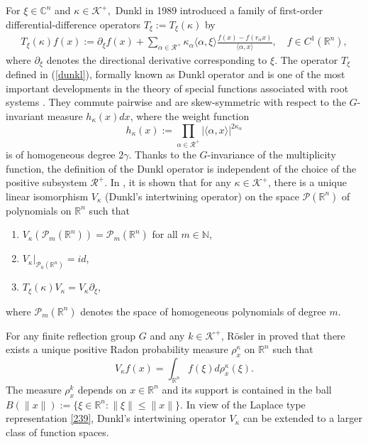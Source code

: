 \documentclass[a4paper,11pt, reqno]{amsart}
\numberwithin{equation}{section}
\theoremstyle{plain}
\theoremstyle{definition}
\theoremstyle{remark}
\begin{document}
 For $\xi \in \mathbb{C}^{n}$ and $\kappa \in \mathcal{K}^{+},$ Dunkl  in 1989 introduced a family of first-order differential-difference operators $T_{\xi}:= T_{\xi}(\kappa)$  by
	\begin{align}\label{dunkl}
		T_{\xi}(\kappa) f(x):=\partial_{\xi} f(x)+\sum_{\alpha \in \mathcal{R}^{+}} \kappa_{\alpha }\langle \alpha, \xi\rangle \frac{f(x)-f\left(r_{\alpha} x\right)}{\langle \alpha, x\rangle}, \quad f \in C^{1}\left(\mathbb{R}^{n}\right),
	\end{align}
	where $\partial_{\xi}$ denotes the directional derivative corresponding to $\xi$.  The operator $T_\xi$   defined in (\ref{dunkl}), formally known as Dunkl operator and is one of the most important developments in the theory of special functions associated with root systems \cite{dun}. They commute pairwise and are skew-symmetric with respect to the $G$-invariant measure $h_\kappa(x)dx$, where the weight function $$h_\kappa(x):=\prod\limits_{\alpha\in \mathcal{R}^{+}}|\langle \alpha, x\rangle|^{2 \kappa_{\alpha}}$$   is of 
 homogeneous degree $2\gamma$. Thanks to the $G$-invariance of the multiplicity function, the definition of the Dunkl operator is independent of the choice of the positive subsystem $\mathcal{R}^{+}$.  In \cite{dun1991},	it is shown that for any $\kappa\in\mathcal{K}^+$, there is a unique linear isomorphism $V_\kappa$ (Dunkl's intertwining operator) on the space $\mathcal{P}(\mathbb{R}^n)$ of polynomials on $\mathbb{R}^n$ such that
	\begin{enumerate}
		\item $V_\kappa\left(\mathcal{P}_m(\mathbb{R}^n)\right)=\mathcal{P}_m(\mathbb{R}^n)$ for all $m\in\mathbb{N}$,
		\item $V_\kappa|_{\mathcal{P}_0(\mathbb{R}^n)}=id$,
		\item $T_\xi(\kappa)V_\kappa=V_\kappa\partial_\xi$,
	\end{enumerate}
	where  $\mathcal{P}_m(\mathbb{R}^n)$ denotes the space of homogeneous polynomials of degree $m$. %
	
	For any finite reflection group $G$ and   any $k\in\mathcal{K}^+$, R\"{o}sler in \cite{ros} proved that there exists a unique positive Radon probability measure $\rho_x^\kappa$ on $\mathbb{R}^n$ such that
	\begin{equation}\label{239}	V_\kappa f(x)=\int_{\mathbb{R}^n}f(\xi)d\rho_x^\kappa(\xi).
	\end{equation}
	The measure $\rho_x^k$ depends on $x\in\mathbb{R}^n$ and its support is contained in the ball $B\left(\|x\|\right):=\{\xi\in\mathbb{R}^n: \|\xi\|\leq\|x\|\}$. In view of the Laplace type representation \eqref{239}, Dunkl's intertwining operator $V_\kappa$ can be extended to a larger class of function spaces.
	
\end{document}
